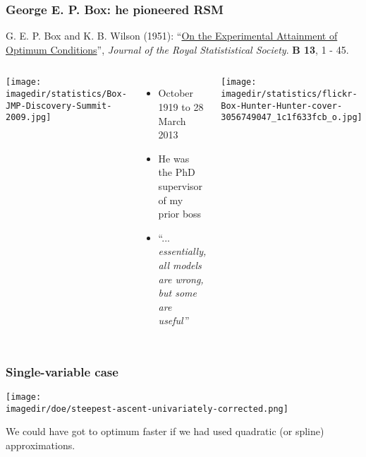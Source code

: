 \begin{frame}\frametitle{George E. P. Box: he pioneered RSM}
	{\scriptsize G. E. P. Box and K. B. Wilson (1951): ``\href{http://www.jstor.org/stable/2983966}{On the Experimental Attainment of Optimum Conditions}'', \emph{Journal of the Royal Statististical Society}. \textbf{B 13}, 1 - 45.}
	\vspace{-12pt}
	\begin{columns}[t]
			\begin{center}
				\texttt{[image: \\imagedir/statistics/Box-JMP-Discovery-Summit-2009.jpg]}
			\end{center}
			
			\vspace{-8pt}
			
			\begin{itemize}
				\item	{\small October 1919 to 28 March 2013}
				\item	He was the PhD supervisor of my prior boss
				\item	``... \emph{essentially, all models are wrong, but some are useful}\,''
			\end{itemize}
			\begin{center}
				\texttt{[image: \\imagedir/statistics/flickr-Box-Hunter-Hunter-cover-3056749047\_1c1f633fcb\_o.jpg]}
			\end{center}
	\end{columns}
\end{frame}

\begin{frame}\frametitle{Single-variable case}
	\begin{center}
		\texttt{[image: \\imagedir/doe/steepest-ascent-univariately-corrected.png]}
	\end{center}
	{\small We could have got to optimum faster if we had used quadratic (or spline) approximations.}
\end{frame}


